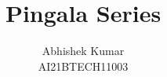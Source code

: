 \documentclass[journal,12pt,twocolumn]{IEEEtran}
\begin{document}
\makeatletter
{}
\makeatother
\let\StandardTheFigure\thefigure
\renewcommand{\thefigure}{\theproblem}
\def\putbox#1#2#3{\makebox[0in][l]{\makebox[#1][l]{}\raisebox{\baselineskip}[0in][0in]{\raisebox{#2}[0in][0in]{#3}}}}
     \def\rightbox#1{\makebox[0in][r]{#1}}
     \def\centbox#1{\makebox[0in]{#1}}
     \def\topbox#1{\raisebox{-\baselineskip}[0in][0in]{#1}}
     \def\midbox#1{\raisebox{-0.5\baselineskip}[0in][0in]{#1}}
\vspace{3cm}
\title{ 
Pingala Series
}
%
%
%
\author{ Abhishek Kumar\\AI21BTECH11003%
}
% 
%
\end{document}
